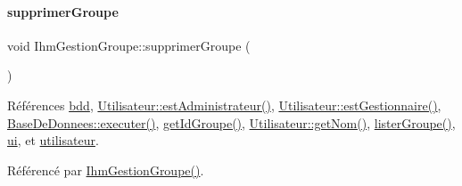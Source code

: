 \paragraph{\texorpdfstring{supprimer\+Groupe}{supprimerGroupe}}
{\footnotesize\ttfamily void Ihm\+Gestion\+Groupe\+::supprimer\+Groupe (\begin{DoxyParamCaption}{ }\end{DoxyParamCaption})\hspace{0.3cm}{\ttfamily [slot]}}



Références \hyperlink{class_ihm_gestion_groupe_a4f0049a7046abe7530d7f7eaed7ed2bc}{bdd}, \hyperlink{class_utilisateur_a2c4ede0ec936ebd64d73df1e1dde3a5d}{Utilisateur\+::est\+Administrateur()}, \hyperlink{class_utilisateur_a3c86ddd77b243fd3f12ad2e85ff06759}{Utilisateur\+::est\+Gestionnaire()}, \hyperlink{class_base_de_donnees_aa8de5f8f8bb17edc43f5c0ee33712081}{Base\+De\+Donnees\+::executer()}, \hyperlink{class_ihm_gestion_groupe_a0f6dd8f645a5bf789521a25322004146}{get\+Id\+Groupe()}, \hyperlink{class_utilisateur_adfffec2519ba338497de55b61e7bc420}{Utilisateur\+::get\+Nom()}, \hyperlink{class_ihm_gestion_groupe_a7afabe81c405b35e7cfd4e760eda8c84}{lister\+Groupe()}, \hyperlink{class_ihm_gestion_groupe_a9785ad3dadc1d2cad8558ca8b682dffd}{ui}, et \hyperlink{class_ihm_gestion_groupe_a87b9d242561e8bf7765aa14a5e124db1}{utilisateur}.



Référencé par \hyperlink{class_ihm_gestion_groupe_a27632f9cf5b66f4403c3534ee0e0ad18}{Ihm\+Gestion\+Groupe()}.


